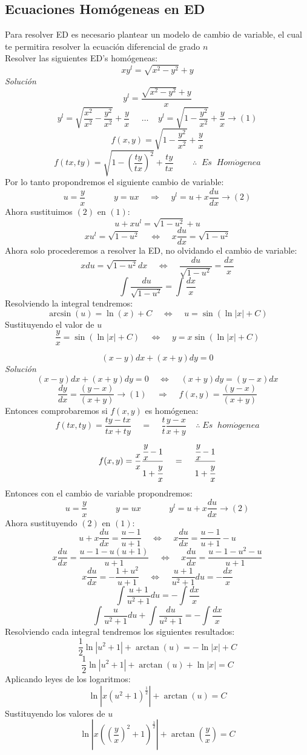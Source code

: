 \documentclass[10pt,executivepaper]{article}
\begin{document}
\subsection{Ecuaciones Homógeneas en ED}
Para resolver ED es necesario plantear un modelo de cambio de variable, el cual te permitira resolver la ecuación diferencial de grado $n$\\
Resolver las siguientes ED's homógeneas:
\[xy^{l}=\sqrt{x^{2}-y^{2}}+y\]
\textit{Solución}
\[y^{l}=\frac{\sqrt{x^{2}-y^{2}}+y}{x}\]
\[y^{l}=\sqrt{\frac{x^{2}}{x^{2}}-\frac{y^{2}}{x^{2}}}+\frac{y}{x}\;\;\;\;\;\ldots\;\;\;\;y^{l}=\sqrt{1-\frac{y^{2}}{x^{2}}}+\frac{y}{x}\rightarrow (1)\]
\[f(x,y)=\sqrt{1-\frac{y^{2}}{x^{2}}}+\frac{y}{x}\]
\[f(tx,ty)=\sqrt{1-\left(\frac{ty}{tx}\right)^{2}}+\frac{ty}{tx}\;\;\;\;\;\;\;\;\therefore\;\;Es\;\;Hom\acute{o}genea\]
Por lo tanto propondremos el siguiente cambio de variable:
\[u=\frac{y}{x}\;\;\;\;\;\;\;\;\;\;\;\;y=ux\;\;\;\;\Rightarrow\;\;\;\;y^{l}=u+x\frac{du}{dx}\rightarrow(2)\]
Ahora sustituimos $(2)$ en $(1)$:
\[u+xu^{l}=\sqrt{1-u^{2}}+u\]
\[xu^{l}=\sqrt{1-u^{2}}\;\;\;\;\Leftrightarrow\;\;\;\;x\frac{du}{dx}=\sqrt{1-u^{2}}\]
Ahora solo procederemos a resolver la ED, no olvidando el cambio de variable:
\[xdu=\sqrt{1-u^{2}}dx\;\;\;\;\Leftrightarrow\;\;\;\;\frac{du}{\sqrt{1-u^{2}}}=\frac{dx}{x}\]
\[\int\frac{du}{\sqrt{1-u^{2}}}=\int\frac{dx}{x}\]
Resolviendo la integral tendremos:
\[\arcsin(u)=\ln(x)+C\;\;\;\;\Leftrightarrow\;\;\;\;u=\sin\left(\ln\left|x\right|+C\right)\]
Sustituyendo el valor de $u$
\[\frac{y}{x}=\sin\left(\ln\left|x\right|+C\right)\;\;\;\;\Leftrightarrow\;\;\;\;y=x\sin\left(\ln\left|x\right|+C\right)\]

\clearpage
\[(x-y)dx+(x+y)dy=0\]
\textit{Solución}
\[(x-y)dx+(x+y)dy=0\;\;\;\;\Leftrightarrow\;\;\;\;(x+y)dy=(y-x)dx\]
\[\frac{dy}{dx}=\frac{(y-x)}{(x+y)}\rightarrow(1)\;\;\;\;\Rightarrow\;\;\;\;f(x,y)=\frac{(y-x)}{(x+y)}\]
Entonces comprobaremos si $f(x,y)$ es homógenea:
\[f(tx,ty)=\frac{ty-tx}{tx+ty}\;\;\;\;=\;\;\;\;\frac{t}{t}\frac{y-x}{x+y}\;\;\;\;\therefore\;Es\;\;hom\acute{o}genea\]
\[f(x,y)=\frac{x}{x}\frac{\cfrac{y}{x}-1}{1+\cfrac{y}{x}}\;\;\;\;=\;\;\;\;\frac{\cfrac{y}{x}-1}{1+\cfrac{y}{x}}\]
Entonces con el cambio de variable propondremos:
\[u=\frac{y}{x}\;\;\;\;\;\;\;\;\;\;\;\;y=ux\;\;\;\;\;\;\;\;\;\;\;\;y^{l}=u+x\frac{du}{dx}\rightarrow(2)\]
Ahora sustituyendo $(2)$ en $(1)$:
\[u+x\frac{du}{dx}=\frac{u-1}{u+1}\;\;\;\;\Leftrightarrow \;\;\;\;x\frac{du}{dx}=\frac{u-1}{u+1}-u\]
\[x\frac{du}{dx}=\frac{u-1-u(u+1)}{u+1}\;\;\;\;\Leftrightarrow \;\;\;\;x\frac{du}{dx}=\frac{u-1-u^{2}-u}{u+1}\]
\[x\frac{du}{dx}=-\frac{1+u^{2}}{u+1}\;\;\;\;\Leftrightarrow \;\;\;\;\frac{u+1}{u^{2}+1}du=-\frac{dx}{x}\]
\[\int\frac{u+1}{u^{2}+1}du=-\int\frac{dx}{x}\]
\[\int\frac{u}{u^{2}+1}du+\int\frac{du}{u^{2}+1}=-\int\frac{dx}{x}\]
Resolviendo cada integral tendremos los siguientes resultados:
\[\frac{1}{2}\ln\left|u^{2}+1\right|+\arctan(u)=-\ln\left|x\right|+C\]
\[\frac{1}{2}\ln\left|u^{2}+1\right|+\arctan(u)+\ln\left|x\right|=C\]
Aplicando leyes de los logaritmos:
\[\ln\left|x\left(u^{2}+1\right)^{\frac{1}{2}}\right|+\arctan(u)=C\]
Sustituyendo los valores de $u$
\[\ln\left|x\left(\left(\frac{y}{x}\right)^{2}+1\right)^{\frac{1}{2}}\right|+\arctan\left(\frac{y}{x}\right)=C\]
\end{document}
